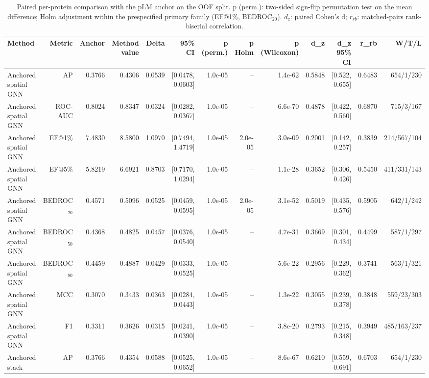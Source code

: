 \begin{table}[t]
\centering
\small
\caption{Paired per-protein comparison with the pLM anchor on the OOF split. p (perm.): two-sided sign-flip permutation test on the mean difference; Holm adjustment within the prespecified primary family (EF@1\%, BEDROC$_{20}$). $d_z$: paired Cohen's d; $r_{rb}$: matched-pairs rank-biserial correlation.}
\label{tab:table2_paired_vs_anchor_oof}
\begin{tabular}{lrrrrrrrrrrrr}
\toprule
Method & Metric & Anchor & Method value & Delta & 95\% CI & p (perm.) & p Holm & p (Wilcoxon) & d\_z & d\_z 95\% CI & r\_rb & W/T/L \\
\midrule
Anchored spatial GNN & AP & 0.3766 & 0.4306 & 0.0539 & [0.0478, 0.0603] & 1.0e-05 & -- & 1.4e-62 & 0.5848 & [0.522, 0.655] & 0.6483 & 654/1/230 \\
Anchored spatial GNN & ROC-AUC & 0.8024 & 0.8347 & 0.0324 & [0.0282, 0.0367] & 1.0e-05 & -- & 6.6e-70 & 0.4878 & [0.422, 0.560] & 0.6870 & 715/3/167 \\
Anchored spatial GNN & EF@1\% & 7.4830 & 8.5800 & 1.0970 & [0.7494, 1.4719] & 1.0e-05 & 2.0e-05 & 3.0e-09 & 0.2001 & [0.142, 0.257] & 0.3839 & 214/567/104 \\
Anchored spatial GNN & EF@5\% & 5.8219 & 6.6921 & 0.8703 & [0.7170, 1.0294] & 1.0e-05 & -- & 1.1e-28 & 0.3652 & [0.306, 0.426] & 0.5450 & 411/331/143 \\
Anchored spatial GNN & BEDROC$_{20}$ & 0.4571 & 0.5096 & 0.0525 & [0.0459, 0.0595] & 1.0e-05 & 2.0e-05 & 3.1e-52 & 0.5019 & [0.435, 0.576] & 0.5905 & 642/1/242 \\
Anchored spatial GNN & BEDROC$_{50}$ & 0.4368 & 0.4825 & 0.0457 & [0.0376, 0.0540] & 1.0e-05 & -- & 4.7e-31 & 0.3669 & [0.301, 0.434] & 0.4499 & 587/1/297 \\
Anchored spatial GNN & BEDROC$_{80}$ & 0.4459 & 0.4887 & 0.0429 & [0.0333, 0.0525] & 1.0e-05 & -- & 5.6e-22 & 0.2956 & [0.229, 0.362] & 0.3741 & 563/1/321 \\
Anchored spatial GNN & MCC & 0.3070 & 0.3433 & 0.0363 & [0.0284, 0.0443] & 1.0e-05 & -- & 1.3e-22 & 0.3055 & [0.239, 0.378] & 0.3848 & 559/23/303 \\
Anchored spatial GNN & F1 & 0.3311 & 0.3626 & 0.0315 & [0.0241, 0.0390] & 1.0e-05 & -- & 3.8e-20 & 0.2793 & [0.215, 0.348] & 0.3949 & 485/163/237 \\
Anchored stack & AP & 0.3766 & 0.4354 & 0.0588 & [0.0525, 0.0652] & 1.0e-05 & -- & 8.6e-67 & 0.6210 & [0.559, 0.691] & 0.6703 & 654/1/230 \\

\end{tabular}
\end{table}
